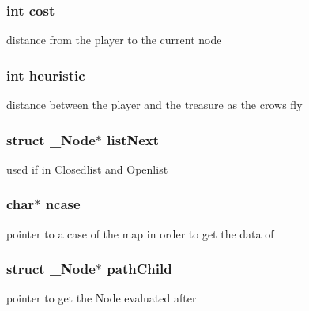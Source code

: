 \subsubsection[{\texorpdfstring{cost}{cost}}]{\setlength{\rightskip}{0pt plus 5cm}int cost}\hypertarget{struct___node_a66700f11d42fee2413e58dbf49c43ee1}{}\label{struct___node_a66700f11d42fee2413e58dbf49c43ee1}
distance from the player to the current node 
\subsubsection[{\texorpdfstring{heuristic}{heuristic}}]{\setlength{\rightskip}{0pt plus 5cm}int heuristic}\hypertarget{struct___node_a266b59afb2a9e30cb84c2b14388fb5fe}{}\label{struct___node_a266b59afb2a9e30cb84c2b14388fb5fe}
distance between the player and the treasure as the crows fly 
\subsubsection[{\texorpdfstring{list\+Next}{listNext}}]{\setlength{\rightskip}{0pt plus 5cm}struct {\bf \+\_\+\+Node}$\ast$ list\+Next}\hypertarget{struct___node_a92b940ae1bafab81f2c09dcb727b2759}{}\label{struct___node_a92b940ae1bafab81f2c09dcb727b2759}
used if in Closedlist and Openlist 
\subsubsection[{\texorpdfstring{ncase}{ncase}}]{\setlength{\rightskip}{0pt plus 5cm}char$\ast$ ncase}\hypertarget{struct___node_aa0cc47f15f87b45c6960e18fd786f286}{}\label{struct___node_aa0cc47f15f87b45c6960e18fd786f286}
pointer to a case of the map in order to get the data of 
\subsubsection[{\texorpdfstring{path\+Child}{pathChild}}]{\setlength{\rightskip}{0pt plus 5cm}struct {\bf \+\_\+\+Node}$\ast$ path\+Child}\hypertarget{struct___node_ac1bcf3cc6dca353ea81f1e92b01d7ecb}{}\label{struct___node_ac1bcf3cc6dca353ea81f1e92b01d7ecb}
pointer to get the Node evaluated after 
